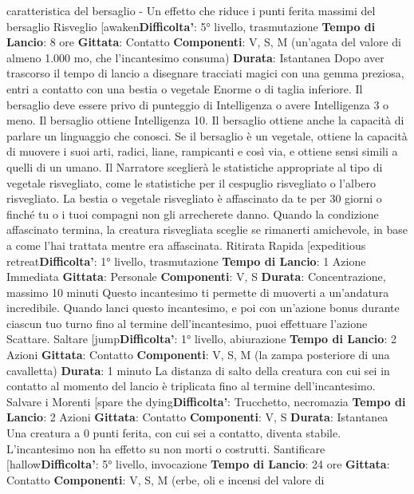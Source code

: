 \begin{multicols}{2}
caratteristica del bersaglio
- Un effetto che riduce i punti ferita massimi del
bersaglio
Risveglio
[awaken\textbf{Difficolta'}:
5° livello, trasmutazione
\textbf{Tempo di Lancio}: 8 ore
\textbf{Gittata}: Contatto
\textbf{Componenti}: V, S, M (un’agata del valore di almeno
1.000 mo, che l’incantesimo consuma)
\textbf{Durata}: Istantanea
Dopo aver trascorso il tempo di lancio a disegnare
tracciati magici con una gemma preziosa, entri a
contatto con una bestia o vegetale Enorme o di taglia
inferiore. Il bersaglio deve essere privo di punteggio di
Intelligenza o avere Intelligenza 3 o meno. Il bersaglio
ottiene Intelligenza 10. Il bersaglio ottiene anche la
capacità di parlare un linguaggio che conosci. Se il
bersaglio è un vegetale, ottiene la capacità di muovere i
suoi arti, radici, liane, rampicanti e così via, e ottiene
sensi simili a quelli di un umano. Il Narratore sceglierà le
statistiche appropriate al tipo di vegetale risvegliato,
come le statistiche per il cespuglio risvegliato o l’albero
risvegliato.
La bestia o vegetale risvegliato è affascinato da te per
30 giorni o finché tu o i tuoi compagni non gli
arrecherete danno. Quando la condizione affascinato
termina, la creatura risvegliata sceglie se rimanerti
amichevole, in base a come l’hai trattata mentre era
affascinata.
Ritirata Rapida
[expeditious retreat\textbf{Difficolta'}:
1° livello, trasmutazione
\textbf{Tempo di Lancio}: 1 Azione Immediata
\textbf{Gittata}: Personale
\textbf{Componenti}: V, S
\textbf{Durata}: Concentrazione, massimo 10 minuti
Questo incantesimo ti permette di muoverti a
un’andatura incredibile. Quando lanci questo
incantesimo, e poi con un’azione bonus durante
ciascun tuo turno fino al termine dell’incantesimo, puoi
effettuare l’azione Scattare.
Saltare
[jump\textbf{Difficolta'}:
1° livello, abiurazione
\textbf{Tempo di Lancio}: 2 Azioni
\textbf{Gittata}: Contatto
\textbf{Componenti}: V, S, M (la zampa posteriore di una
cavalletta)
\textbf{Durata}: 1 minuto
La distanza di salto della creatura con cui sei in contatto
al momento del lancio è triplicata fino al termine
dell’incantesimo.
Salvare i Morenti
[spare the dying\textbf{Difficolta'}:
Trucchetto, necromazia
\textbf{Tempo di Lancio}: 2 Azioni
\textbf{Gittata}: Contatto
\textbf{Componenti}: V, S
\textbf{Durata}: Istantanea
Una creatura a 0 punti ferita, con cui sei a contatto,
diventa stabile. L’incantesimo non ha effetto su non
morti o costrutti.
Santificare
[hallow\textbf{Difficolta'}:
5° livello, invocazione
\textbf{Tempo di Lancio}: 24 ore
\textbf{Gittata}: Contatto
\textbf{Componenti}: V, S, M (erbe, oli e incensi del valore di

\end{multicols}
